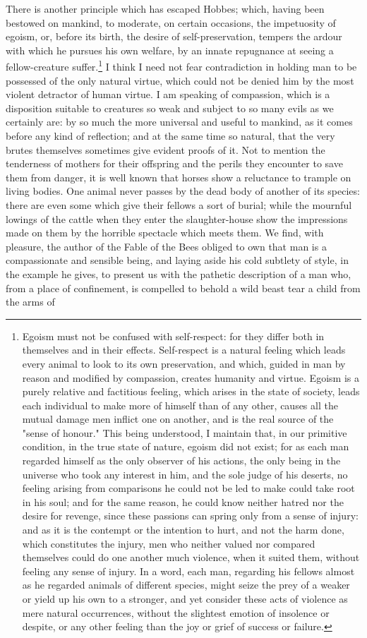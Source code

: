 \documentclass[12pt]{report}
\begin{document}
There is another principle which has escaped Hobbes; which, having been bestowed on mankind, to moderate, on certain occasions, the impetuosity of egoism, or, before its birth, the desire of self-preservation, tempers the ardour with which he pursues his own welfare, by an innate repugnance at seeing a fellow-creature suffer.\footnote{Egoism must not be confused with self-respect: for they differ both in themselves and in their effects. Self-respect is a natural feeling which leads every animal to look to its own preservation, and which, guided in man by reason and modified by compassion, creates humanity and virtue. Egoism is a purely relative and factitious feeling, which arises in the state of society, leads each individual to make more of himself than of any other, causes all the mutual damage men inflict one on another, and is the real source of the "sense of honour." This being understood, I maintain that, in our primitive condition, in the true state of nature, egoism did not exist; for as each man regarded himself as the only observer of his actions, the only being in the universe who took any interest in him, and the sole judge of his deserts, no feeling arising from comparisons he could not be led to make could take root in his soul; and for the same reason, he could know neither hatred nor the desire for revenge, since these passions can spring only from a sense of injury: and as it is the contempt or the intention to hurt, and not the harm done, which constitutes the injury, men who neither valued nor compared themselves could do one another much violence, when it suited them, without feeling any sense of injury. In a word, each man, regarding his fellows almost as he regarded animals of different species, might seize the prey of a weaker or yield up his own to a stronger, and yet consider these acts of violence as mere natural occurrences, without the slightest emotion of insolence or despite, or any other feeling than the joy or grief of success or failure.} I think I need not fear contradiction in holding man to be possessed of the only natural virtue, which could not be denied him by the most violent detractor of human virtue. I am speaking of compassion, which is a disposition suitable to creatures so weak and subject to so many evils as we certainly are: by so much the more universal and useful to mankind, as it comes before any kind of reflection; and at the same time so natural, that the very brutes themselves sometimes give evident proofs of it. Not to mention the tenderness of mothers for their offspring and the perils they encounter to save them from danger, it is well known that horses show a reluctance to trample on living bodies. One animal never passes by the dead body of another of its species: there are even some which give their fellows a sort of burial; while the mournful lowings of the cattle when they enter the slaughter-house show the impressions made on them by the horrible spectacle which meets them. We find, with pleasure, the author of the Fable of the Bees obliged to own that man is a compassionate and sensible being, and laying aside his cold subtlety of style, in the example he gives, to present us with the pathetic description of a man who, from a place of confinement, is compelled to behold a wild beast tear a child from the arms of 
\end{document}
